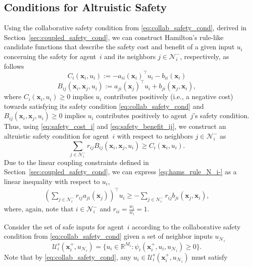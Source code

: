 \documentclass[letterpaper, 10 pt, conference]{ieeeconf}  %
\theoremstyle{plain}
\begin{document}
\subsection{Conditions for Altruistic Safety}
Using the collaborative safety condition from \eqref{eq:collab_safety_cond}, derived in Section~\ref{sec:coupled_safety_cond}, we can construct Hamilton's rule-like candidate functions that describe the safety cost and benefit of a given input $u_i$ concerning the safety for agent~$i$ and its neighbors $j\in \mathcal{N}_i^-$, respectively, as follows
\begin{equation}\label{eq:safety_cost_i}
    C_i(\mathbf{x}_i,u_i) := -a_{ii}(\mathbf{x}_i)^\top u_i - b_{ii}(\mathbf{x}_i)
\end{equation}
\begin{equation}\label{eq:safety_benefit_ij}
    B_{ij}(\mathbf{x}_i,\mathbf{x}_j,u_i) := a_{ji}(\mathbf{x}_j)^\top u_i + b_{ji}(\mathbf{x}_j,\mathbf{x}_i), 
\end{equation}
where $C_i(\mathbf{x}_i,u_i) \geq 0$ implies $u_i$ contributes positively (i.e., a negative cost) towards satisfying its safety condition \eqref{eq:collab_safety_cond} and $B_{ij}(\mathbf{x}_i,\mathbf{x}_j,u_i) \geq 0$ implies $u_i$ contributes positively to agent~$j$'s safety condition.
Thus, using \eqref{eq:safety_cost_i} and \eqref{eq:safety_benefit_ij}, we construct an altruistic safety condition for agent~$i$ with respect to neighbors $j \in \mathcal{N}_i^-$ as
\begin{equation}\label{eq:hams_rule_N_i-}
    \sum_{j \in \mathcal{N}_i^-} r_{ij}B_{ij}(\mathbf{x}_i,\mathbf{x}_j,u_i) \geq C_i(\mathbf{x}_i,u_i).
\end{equation}
Due to the linear coupling constraints defined in Section~\ref{sec:coupled_safety_cond}, we can express \eqref{eq:hams_rule_N_i-} as a linear inequality with respect to $u_i$,
\begin{equation} \label{eq:hams_rule_lin_eq}
    \begin{aligned}
       \left( \sum_{j \in \mathcal{N}_i^-} r_{ij}  a_{ji}(\mathbf{x}_j)  \right)^\top u_i 
        \geq  - \sum_{j \in \mathcal{N}_i^-} r_{ij} b_{ji}(\mathbf{x}_j,\mathbf{x}_i),
    \end{aligned}   
\end{equation}
where, again, note that $i \in \mathcal{N}_i^-$ and $r_{ii} = \frac{w_i}{w_i} = 1$.

Consider the set of safe inputs for agent~$i$ according to the collaborative safety condition from \eqref{eq:collab_safety_cond} given a set of neighbor inputs $u_{\mathcal{N}_i}$
\begin{equation} 
    \mathcal{U}_i^s(\mathbf{x}_i^+, u_{\mathcal{N}_i}) = \{ u_i \in \mathbb{R}^{M_i}: \psi_i(\mathbf{x}_i^+, u_i, u_{\mathcal{N}_i}) \geq 0 \}.
\end{equation}
Note that by \eqref{eq:collab_safety_cond}, any $u_i \in \mathcal{U}_i^s(\mathbf{x}_i^+, u_{\mathcal{N}_i})$  must satisfy
\end{document}
